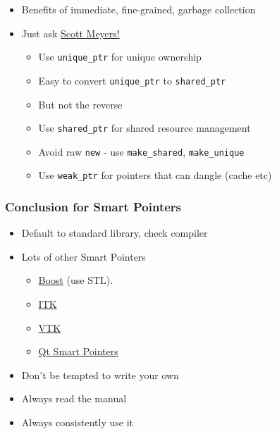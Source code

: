 \begin{itemize}
\tightlist
\item
  Benefits of immediate, fine-grained, garbage collection
\item
  Just ask
  \href{https://www.amazon.co.uk/Effective-Modern-Specific-Ways-Improve/dp/1491903996/ref=sr_1_1?ie=UTF8\&qid=1484571499\&sr=8-1\&keywords=Effective+Modern+C\%2B\%2B}{Scott
  Meyers!}

  \begin{itemize}
  \tightlist
  \item
    Use \texttt{unique\_ptr} for unique ownership
  \item
    Easy to convert \texttt{unique\_ptr} to \texttt{shared\_ptr}
  \item
    But not the reverse
  \item
    Use \texttt{shared\_ptr} for shared resource management
  \item
    Avoid raw \texttt{new} - use \texttt{make\_shared},
    \texttt{make\_unique}
  \item
    Use \texttt{weak\_ptr} for pointers that can dangle (cache etc)
  \end{itemize}
\end{itemize}

\hypertarget{conclusion-for-smart-pointers}{%
\subsubsection{Conclusion for Smart
Pointers}\label{conclusion-for-smart-pointers}}

\begin{itemize}
\tightlist
\item
  Default to standard library, check compiler
\item
  Lots of other Smart Pointers

  \begin{itemize}
  \tightlist
  \item
    \href{http://www.boost.org}{Boost} (use STL).
  \item
    \href{http://www.itk.org}{ITK}
  \item
    \href{http://www.vtk.org/Wiki/VTK/Tutorials/SmartPointers}{VTK}
  \item
    \href{https://wiki.qt.io/Smart_Pointers}{Qt Smart Pointers}
  \end{itemize}
\item
  Don't be tempted to write your own
\item
  Always read the manual
\item
  Always consistently use it
\end{itemize}

